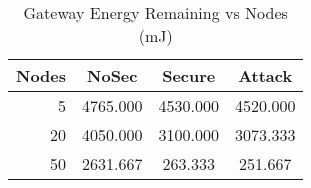 \begin{table}[h]
\centering
\caption{Gateway Energy Remaining vs Nodes (mJ)}
\label{tab:energy}
\begin{tabular}{rccc}
\toprule
Nodes & NoSec & Secure & Attack \\ \midrule
5 & 4765.000 & 4530.000 & 4520.000 \\
20 & 4050.000 & 3100.000 & 3073.333 \\
50 & 2631.667 & 263.333 & 251.667 \\
\bottomrule
\end{tabular}
\end{table}